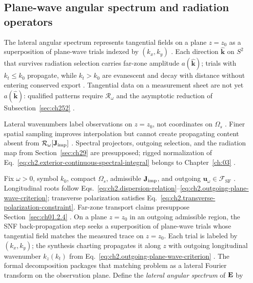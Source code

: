 \subsection{Plane-wave angular spectrum and radiation operators}
\label{sec:ch291}

The lateral angular spectrum represents tangential fields on a plane $z=z_0$ as a superposition
of plane-wave trials indexed by $(k_x,k_y)$ \cite{jackson1999,stratton1941}. Each direction
$\widehat{\mathbf{k}}$ on $S^2$ that survives radiation selection carries far-zone amplitude
$a(\widehat{\mathbf{k}})$; trials with $k_t\le k_0$ propagate, while $k_t>k_0$ are evanescent and
decay with distance without entering conserved export \cite{hansen1988,harrington2001}. Tangential
data on a measurement sheet are not yet $a(\widehat{\mathbf{k}})$: qualified patterns require
$\mathcal{R}_\omega$ and the asymptotic reduction of Subsection~\ref{sec:ch252}
\cite{devaney2004,maxwell1873}.

Lateral wavenumbers label observations on $z=z_0$, not coordinates on $\Omega_s$
\cite{stratton1941}. Finer spatial sampling improves interpolation but cannot create propagating
content absent from $\mathcal{R}_\omega[\mathbf{J}_{\mathrm{imp}}]$ \cite{devaney2004}. Spectral projectors,
outgoing selection, and the radiation map from Section~\ref{sec:ch29} are presupposed; rigged
normalization of Eq.~\eqref{eq:ch2.exterior-continuous-spectral-integral} belongs to
Chapter~\ref{ch:03} \cite{harrington2001}.

Fix $\omega>0$, symbol $k_0$, compact $\Omega_s$, admissible $\mathbf{J}_{\mathrm{imp}}$, and outgoing
$\mathbf{u}_\omega\in\mathcal{F}_{\mathrm{SF}}$ \cite{stratton1941}. Longitudinal roots follow
Eqs.~\eqref{eq:ch2.dispersion-relation}--\eqref{eq:ch2.outgoing-plane-wave-criterion}; transverse
polarization satisfies Eq.~\eqref{eq:ch2.transverse-polarization-constraint}. Far-zone transport
claims presuppose Section~\ref{sec:ch01.2.4} \cite{harrington2001}.
On a plane \(z=z_0\) in an outgoing admissible region, the SNF back-propagation step seeks a
superposition of plane-wave trials whose tangential field matches the measured trace on
\(z=z_0\). Each trial is labeled by \((k_x,k_y)\); the synthesis charting propagates it along
\(z\) with outgoing longitudinal wavenumber \(k_z(k_t)\) from
Eq.~\eqref{eq:ch2.outgoing-plane-wave-criterion} \cite{stratton1941}. The formal decomposition
packages that matching problem as a lateral Fourier transform on the observation plane.
Define the \emph{lateral angular spectrum} of \(\mathbf{E}\) by

